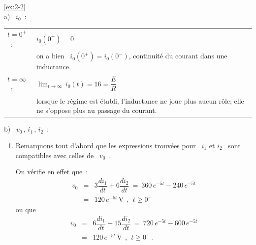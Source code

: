 \begin{solexercise}{\ref{ex:2-2}}
\\
a) \ $i_0$~:
\begin{center}
	\begin{tabular}{lp{8cm}}
		$t=0^+$~: & $i_0(0^+) = 0$~\\ &  on a bien \ $i_0(0^+) = i_0(0^-)$,
		continuité du courant dans une inductance.\\ 
		$t=\infty$~: &
		${\displaystyle \lim_{t\rightarrow\infty}}\, i_0(t) = 16 =
		{\displaystyle \dfrac{E}{R}}$\\ 
		& lorsque le régime est établi,
		l'inductance ne joue plus aucun rôle; elle ne s'oppose plus au passage
		du courant.
	\end{tabular}
\end{center}

\noindent b) \ $v_0\, , \, i_1\, , \, i_2$~:
\begin{enumerate}
	\item Remarquons tout d'abord que les expressions trouvées pour \
	$i_1$ et $i_2$ \ sont compatibles avec celles de \ $v_0$~.
	
	On vérifie en effet que~:
	\begin{eqnarray*}
		v_0 &=& 3 \dfrac{di_1}{dt} + 6 \dfrac{di_2}{dt} \: = \: 360\, e^{-5t} - 240\, e^{-5t}\\
		&=& 120 \, e^{-5t} \, \text{V}~~,~~ t\geq 0^+
	\end{eqnarray*}
	ou que
	\begin{eqnarray*}
		v_0 &=& 6 \dfrac{di_1}{dt} + 15 \dfrac{di_2}{dt} \: = \: 720\, e^{-5t} - 600\, e^{-5t}\\
		&=& 120 \, e^{-5t} \, \text{V}~~,~~ t\geq 0^+~.
	\end{eqnarray*}
	

\end{enumerate}
\end{solexercise}
